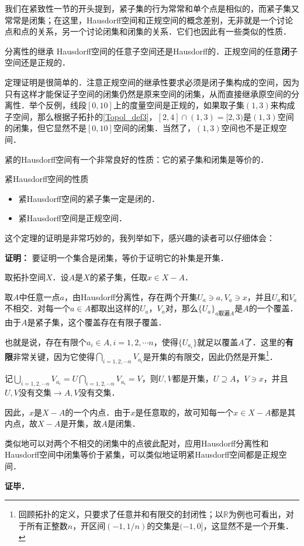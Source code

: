 我们在紧致性一节的开头提到，紧子集的行为常常和单个点是相似的，而紧子集又常常是闭集；在这里，Hausdorff空间和正规空间的概念差别，无非就是一个讨论点和点的关系，另一个讨论闭集和闭集的关系．它们也因此有一些类似的性质．

\begin{theorem}{分离性的继承}
Hausdorff空间的任意子空间还是Hausdorff的．正规空间的任意\textbf{闭}子空间还是正规的．
\end{theorem}

定理证明是很简单的．注意正规空间的继承性要求必须是闭子集构成的空间，因为只有这样才能保证子空间的闭集仍然是原来空间的闭集，从而直接继承原空间的分离性．举个反例，线段$[0,10]$上的度量空间是正规的，如果取子集$(1,3)$来构成子空间，那么根据子拓扑的\autoref{Topol_def3}，$[2,4]\cap(1,3)=[2,3)$是$(1,3)$空间的闭集，但它显然不是$[0,10]$空间的闭集．当然了，$(1,3)$空间也不是正规空间．

紧的Hausdorff空间有一个非常良好的性质：它的紧子集和闭集是等价的．
\begin{theorem}{紧Hausdorff空间的性质}
\begin{itemize}
\item 紧Hausdorff空间的紧子集一定是闭的．
\item 紧Hausdorff空间是正规空间．

\end{itemize}
\end{theorem}

这个定理的证明是非常巧妙的，我列举如下，感兴趣的读者可以仔细体会：

\textbf{证明：}
要证明一个集合是闭集，等价于证明它的补集是开集．

取拓扑空间$X$．设$A$是$X$的紧子集，任取$x\in X-A$．

取$A$中任意一点$a$，由Hausdorff分离性，存在两个开集$U_a\ni a, V_a\ni x$，并且$U_a$和$V_a$不相交．对每一个$a\in A$都取出这样的$U_a$，$V_a$对，那么$\{U_a\}_{a\text{取遍}A}$是$A$的一个覆盖．由于$A$是紧子集，这个覆盖存在有限子覆盖．

也就是说，存在有限个$a_i\in A, i=1, 2, \cdots n$，使得$\{U_{a_i}\}$就足以覆盖$A$了．这里的\textbf{有限}非常关键，因为它使得$\bigcap\limits_{i=1,2, \cdots n}V_{a_i}$是开集的有限交，因此仍然是开集\footnote{回顾拓扑的定义，只要求了任意并和有限交的封闭性；以$\mathbb{R}$为例也可看出，对于所有正整数$n$，开区间$(-1,1/n)$的交集是$(-1, 0]$，这显然不是一个开集．}．

记$\bigcup\limits_{i=1,2, \cdots n}V_{a_i}=U$$\bigcap\limits_{i=1,2, \cdots n}V_{a_i}=V$，则$U, V$都是开集，$U\supseteq A$，$V\ni x$，并且$U, V$没有交集$\rightarrow A, V$没有交集．

因此，$x$是$X-A$的一个内点．由于$x$是任意取的，故可知每一个$x\in X-A$都是其内点，故$X-A$是开集，故$A$是闭集．

类似地可以对两个不相交的闭集中的点彼此配对，应用Hausdorff分离性和Hausdorff空间中闭集等价于紧集，可以类似地证明紧Hausdorff空间都是正规空间．


\textbf{证毕．}
